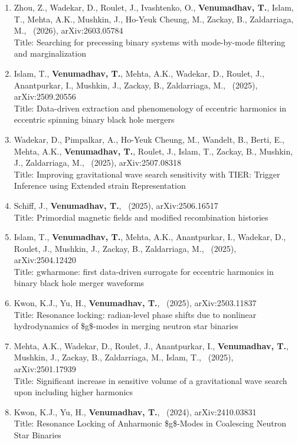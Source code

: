 \documentclass{article}
\newlength{\cvindent}
\newenvironment{cvlist}{%
  \begin{list}{}{%
    \setlength{\leftmargin}{\cvindent}%
    \setlength{\rightmargin}{0pt}%
    \setlength{\topsep}{0pt}%
    \setlength{\partopsep}{0pt}%
    \setlength{\parsep}{0pt}%
    \setlength{\itemsep}{0pt}%
  }%
  \item\relax
}{%
  \end{list}
}
\begin{document}
\begin{cvlist}
\begin{enumerate}[leftmargin=*,itemsep=0.32em,topsep=0.3em]
\item Zhou, Z., Wadekar, D., Roulet, J., Ivashtenko, O., \textbf{Venumadhav, T.}, Islam, T., Mehta, A.K., Mushkin, J., Ho-Yeuk Cheung, M., Zackay, B., Zaldarriaga, M., \ (2026), arXiv:2603.05784 \\
Title: Searching for precessing binary systems with mode-by-mode filtering and marginalization
\item Islam, T., \textbf{Venumadhav, T.}, Mehta, A.K., Wadekar, D., Roulet, J., Anantpurkar, I., Mushkin, J., Zackay, B., Zaldarriaga, M., \ (2025), arXiv:2509.20556 \\
Title: Data-driven extraction and phenomenology of eccentric harmonics in eccentric spinning binary black hole mergers
\item Wadekar, D., Pimpalkar, A., Ho-Yeuk Cheung, M., Wandelt, B., Berti, E., Mehta, A.K., \textbf{Venumadhav, T.}, Roulet, J., Islam, T., Zackay, B., Mushkin, J., Zaldarriaga, M., \ (2025), arXiv:2507.08318 \\
Title: Improving gravitational wave search sensitivity with TIER: Trigger Inference using Extended strain Representation
\item Schiff, J., \textbf{Venumadhav, T.}, \ (2025), arXiv:2506.16517 \\
Title: Primordial magnetic fields and modified recombination histories
\item Islam, T., \textbf{Venumadhav, T.}, Mehta, A.K., Anantpurkar, I., Wadekar, D., Roulet, J., Mushkin, J., Zackay, B., Zaldarriaga, M., \ (2025), arXiv:2504.12420 \\
Title: gwharmone: first data-driven surrogate for eccentric harmonics in binary black hole merger waveforms
\item Kwon, K.J., Yu, H., \textbf{Venumadhav, T.}, \ (2025), arXiv:2503.11837 \\
Title: Resonance locking: radian-level phase shifts due to nonlinear hydrodynamics of \$g\$-modes in merging neutron star binaries
\item Mehta, A.K., Wadekar, D., Roulet, J., Anantpurkar, I., \textbf{Venumadhav, T.}, Mushkin, J., Zackay, B., Zaldarriaga, M., Islam, T., \ (2025), arXiv:2501.17939 \\
Title: Significant increase in sensitive volume of a gravitational wave search upon including higher harmonics
\item Kwon, K.J., Yu, H., \textbf{Venumadhav, T.}, \ (2024), arXiv:2410.03831 \\
Title: Resonance Locking of Anharmonic \$g\$-Modes in Coalescing Neutron Star Binaries

\end{enumerate}
\end{cvlist}
\end{document}
